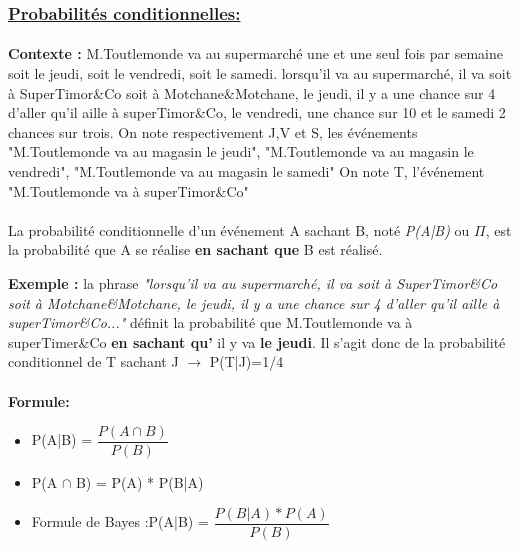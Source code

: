 \documentclass[a4paper]{article}
\begin{document}
\subsubsection{{\underline{Probabilités conditionnelles:}}}

\paragraph{}
\textbf{Contexte :} M.Toutlemonde va au supermarché une et une seul fois par semaine soit le jeudi, soit le vendredi, soit le samedi. lorsqu'il va au supermarché, il va soit à SuperTimor\&Co soit à Motchane\&Motchane, le jeudi, il y a une chance sur 4 d'aller qu'il aille à superTimor\&Co, le vendredi, une chance sur 10 et le samedi 2 chances sur trois.
\newline On note respectivement J,V et S, les événements "M.Toutlemonde va au magasin le jeudi", "M.Toutlemonde va au magasin le vendredi", "M.Toutlemonde va au magasin le samedi"
\newline On note T, l'événement "M.Toutlemonde va à superTimor\&Co"

\paragraph{}

\begin{rappel}
La probabilité conditionnelle d'un événement A sachant B, noté \textit{P(A|B)} ou \textit{$\Pi$}, est la probabilité que A se réalise \textbf{en sachant que} B est réalisé.
\end{rappel}

\textbf{Exemple :} la phrase \textit{"lorsqu'il va au supermarché, il va soit à SuperTimor\&Co soit à Motchane\&Motchane, le jeudi, il y a une chance sur 4 d'aller qu'il aille à superTimor\&Co..."} définit la probabilité que M.Toutlemonde va à superTimer\&Co \textbf{en sachant qu'} il y va \textbf{le jeudi}. Il s'agit donc de la probabilité conditionnel de T sachant J $\rightarrow$ P(T|J)=1/4


\paragraph{}
\textbf{Formule:}
\begin{itemize}
\item P(A|B) = $\dfrac{P(A \cap B)}{P(B)}$
\item P(A $\cap$ B) = P(A) * P(B|A)
\item Formule de Bayes :P(A|B) = $\dfrac{P(B|A) * P(A)}{P(B)}$
\end{itemize}
\end{document}
